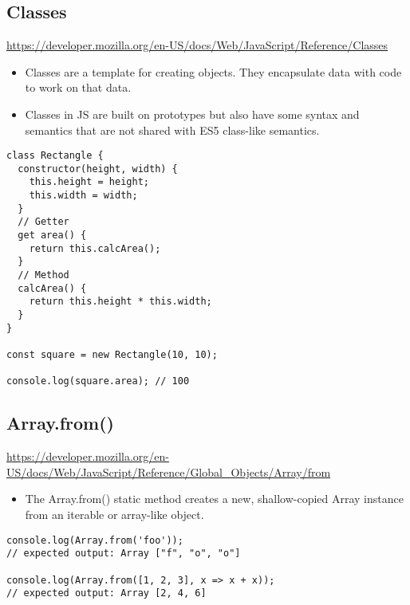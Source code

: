 \documentclass[10pt]{article}
\begin{document}
\medskip %
\pagebreak
\subsection{Classes}

\url{https://developer.mozilla.org/en-US/docs/Web/JavaScript/Reference/Classes}


\begin{itemize}
	\item Classes are a template for creating objects. They encapsulate data with code to work on that data.
	\item Classes in JS are built on prototypes but also have some syntax and semantics that are not shared with ES5 class-like semantics. 
\end{itemize}

\begin{lstlisting}[title=Example Classes, captionpos=t]
class Rectangle {
  constructor(height, width) {
    this.height = height;
    this.width = width;
  }
  // Getter
  get area() {
    return this.calcArea();
  }
  // Method
  calcArea() {
    return this.height * this.width;
  }
}

const square = new Rectangle(10, 10);

console.log(square.area); // 100
\end{lstlisting}
\medskip %








\medskip %
\pagebreak
\subsection{Array.from()}

\url{https://developer.mozilla.org/en-US/docs/Web/JavaScript/Reference/Global_Objects/Array/from}


\begin{itemize}
	\item The Array.from() static method creates a new, shallow-copied Array instance from an iterable or array-like object.
\end{itemize}

\begin{lstlisting}[title=Example from(), captionpos=t]
console.log(Array.from('foo'));
// expected output: Array ["f", "o", "o"]

console.log(Array.from([1, 2, 3], x => x + x));
// expected output: Array [2, 4, 6]
\end{lstlisting}
\end{document}
